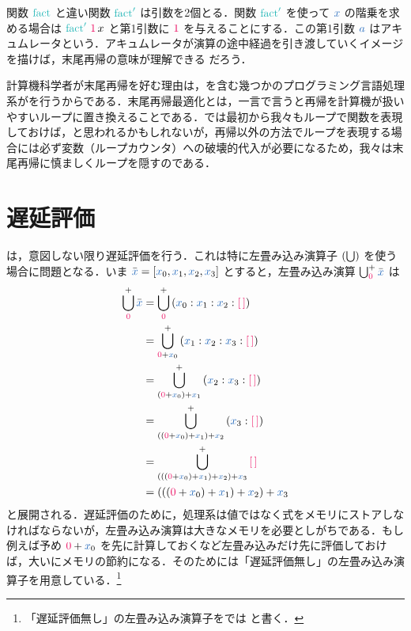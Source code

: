 \documentclass[a5paper,twoside,fleqn,draft]{jsbook}
\begin{document}
関数 $\mFact$ と違い関数 $\mFFact$ は引数を2個とる．関数 $\mFFact$ を使って $\hVar{x}$ の階乗を求める場合は $\mFFact\,\hConstant{1}\,x$ と第1引数に $\hConstant{1}$ を与えることにする．この第1引数 $\hVar{a}$ はアキュムレータという．アキュムレータが演算の途中経過を引き渡していくイメージを描けば，末尾再帰の意味が理解できる
だろう．

計算機科学者が末尾再帰を好む理由は，\haskell を含む幾つかのプログラミング言語処理系がを行うからである．末尾再帰最適化とは，一言で言うと再帰を計算機が扱いやすいループに置き換えることである．では最初から我々もループで関数を表現しておけば，と思われるかもしれないが，再帰以外の方法でループを表現する場合には必ず変数（ループカウンタ）への破壊的代入が必要になるため，我々は末尾再帰に慎ましくループを隠すのである．

\section{遅延評価}

\haskell は，意図しない限り遅延評価を行う．これは特に左畳み込み演算子 $(\operatorname*{\bigcup})$ を使う場合に問題となる．いま $\hListVarWith{x}=[\hVar{x}_0,\hVar{x}_1,\hVar{x}_2,\hVar{x}_3]$ とすると，左畳み込み演算 $\mFold^+_{\hConstant{0}}\hListVarWith{x}$ は
\begin{align}
  \mFold^+_{\hConstant{0}}\hListVarWith{x}
  &=\mFold^+_{\hConstant{0}}{}(\hVar{x}_0:\hVar{x}_1:\hVar{x}_2:\mEmptyList)\\
  &=\mFold^+_{\hConstant{0}+\hVar{x}_0}{}(\hVar{x}_1:\hVar{x}_2:\hVar{x}_3:\mEmptyList)\\
  &=\mFold^+_{(\hConstant{0}+\hVar{x}_0)+\hVar{x}_1}{}(\hVar{x}_2:\hVar{x}_3:\mEmptyList)\\
  &=\mFold^+_{((\hConstant{0}+\hVar{x}_0)+\hVar{x}_1)+\hVar{x}_2}{}(\hVar{x}_3:\mEmptyList)\\
  &=\mFold^+_{(((\hConstant{0}+\hVar{x}_0)+\hVar{x}_1)+\hVar{x}_2)+\hVar{x}_3}{}\mEmptyList\\
  &=(((\hConstant{0}+\hVar{x}_0)+\hVar{x}_1)+\hVar{x}_2)+\hVar{x}_3
\end{align}
と展開される．遅延評価のために，\haskell 処理系は値ではなく式をメモリにストアしなければならないが，左畳み込み演算は大きなメモリを必要としがちである．もし例えば予め $\hConstant{0}+\hVar{x}_0$ を先に計算しておくなど左畳み込みだけ先に評価しておけば，大いにメモリの節約になる．そのために\haskell は「遅延評価無し」の左畳み込み演算子を用意している．\footnote{「遅延評価無し」の左畳み込み演算子を\haskell では  と書く．}
\end{document}
